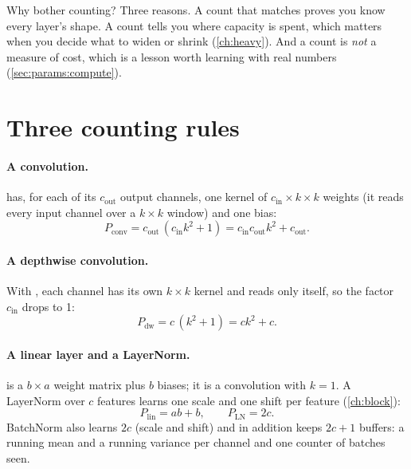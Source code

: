 Why bother counting? Three reasons. A count that matches proves you know every layer's shape. A count
tells you where capacity is spent, which matters when you decide what to widen or shrink
(\cref{ch:heavy}). And a count is \emph{not} a measure of cost, which is a lesson worth learning
with real numbers (\cref{sec:params:compute}).

\section{Three counting rules}\label{sec:params:rules}

\paragraph{A convolution.}  has, for each of its $c_{\text{out}}$ output
channels, one kernel of $c_{\text{in}} \times k \times k$ weights (it reads every input channel over a
$k \times k$ window) and one bias:
\begin{equation}\label{eq:params:conv}
P_{\text{conv}} = c_{\text{out}}\,(c_{\text{in}} k^2 + 1) = c_{\text{in}} c_{\text{out}} k^2 + c_{\text{out}} .
\end{equation}
\paragraph{A depthwise convolution.} With , each channel has its own $k \times k$ kernel
and reads only itself, so the factor $c_{\text{in}}$ drops to 1:
\begin{equation}\label{eq:params:dw}
P_{\text{dw}} = c\,(k^2 + 1) = c k^2 + c .
\end{equation}
\paragraph{A linear layer and a LayerNorm.} is a $b \times a$ weight matrix plus $b$
biases; it is a convolution with $k = 1$. A LayerNorm over $c$ features learns one scale and one shift
per feature (\cref{ch:block}):
\begin{equation}\label{eq:params:lin}
P_{\text{lin}} = a b + b, \qquad P_{\text{LN}} = 2c .
\end{equation}
BatchNorm also learns $2c$ (scale and shift) and in addition keeps $2c + 1$ buffers: a running mean and a
running variance per channel and one counter of batches seen.

